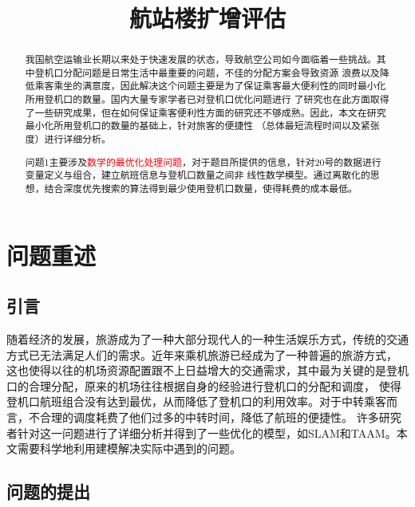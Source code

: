 \documentclass[bwprint]{gmcmthesis}
\title{航站楼扩增评估}
\begin{document}
 \maketitle

\begin{abstract}
我国航空运输业长期以来处于快速发展的状态，导致航空公司如今面临着一些挑战。其中登机口分配问题是日常生活中最重要的问题，不佳的分配方案会导致资源
浪费以及降低乘客乘坐的满意度，因此解决这个问题主要是为了保证乘客最大便利性的同时最小化所用登机口的数量。国内大量专家学者已对登机口优化问题进行
了研究也在此方面取得了一些研究成果，但在如何保证乘客便利性方面的研究还不够成熟。因此，本文在研究最小化所用登机口的数量的基础上，针对旅客的便捷性
（总体最短流程时间以及紧张度）进行详细分析。


问题1主要涉及\textcolor{red}{数学的最优化处理问题}，对于题目所提供的信息，针对20号的数据进行变量定义与组合，建立航班信息与登机口数量之间非
线性数学模型。通过离散化的思想，结合深度优先搜索的算法得到最少使用登机口数量，使得耗费的成本最低。



\end{abstract}

\pagestyle{plain}

\tableofcontents

\section{问题重述}

\subsection{引言}

随着经济的发展，旅游成为了一种大部分现代人的一种生活娱乐方式，传统的交通方式已无法满足人们的需求。近年来乘机旅游已经成为了一种普遍的旅游方式，
这也使得以往的机场资源配置跟不上日益增大的交通需求，其中最为关键的是登机口的合理分配，原来的机场往往根据自身的经验进行登机口的分配和调度，
使得登机口航班组合没有达到最优，从而降低了登机口的利用效率。对于中转乘客而言，不合理的调度耗费了他们过多的中转时间，降低了航班的便捷性。
许多研究者针对这一问题进行了详细分析并得到了一些优化的模型，如SLAM和TAAM。本文需要科学地利用建模解决实际中遇到的问题。

\subsection{问题的提出}
\end{document}
